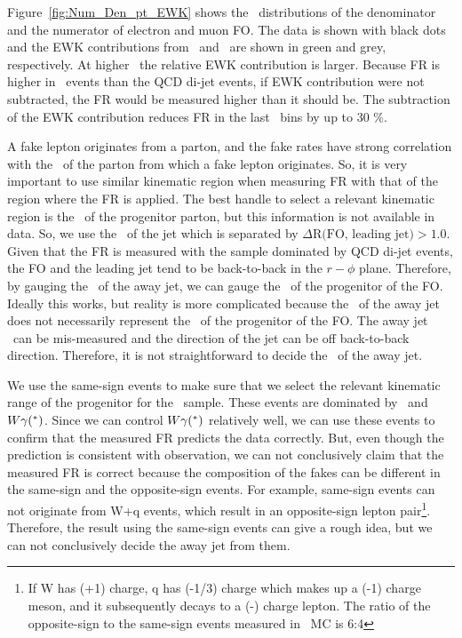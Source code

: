 Figure~\ref{fig:Num_Den_pt_EWK} shows the \pt\ distributions of the denominator and the 
numerator of electron and muon FO. The data is shown with black dots and 
the EWK contributions from \dyll\ and \Wjets\ are shown in green 
and grey, respectively. At higher \pt\ the relative EWK contribution 
is larger. Because FR is higher in \Wjets\ events than the QCD di-jet 
events, if EWK contribution were not subtracted, the FR would be 
measured higher than it should be. The subtraction of the EWK contribution 
reduces FR in the last \pt\ bins by up to 30 \%.

A fake lepton originates from a parton, and the fake rates have strong 
correlation with the \pt\ of the parton from which a fake lepton originates.
So, it is very important to use similar kinematic region when measuring FR 
with that of the region where the FR is applied. The best handle to select 
a relevant kinematic region is the 
\pt\ of the progenitor parton, but this information is not available in data.   
So, we use the \pt\ of the jet which is separated by $\Delta \textrm{R(FO, leading jet)} > 1.0$.  
Given that the FR is measured with the sample dominated by QCD di-jet events, 
the FO and the leading jet tend to be back-to-back in the $r-\phi$ plane.
Therefore, by gauging the \pt\ of the away jet, we can gauge the \pt\ 
of the progenitor of the FO. Ideally this works, but reality is more 
complicated because the \pt\ of the away jet does not necessarily represent 
the \pt\ of the progenitor of the FO. The away jet \pt\ can be mis-measured 
and the direction of the jet can be off back-to-back direction.  
Therefore, it is not straightforward to decide the \pt\ of the away jet. 

We use the same-sign events to make sure that we select the 
relevant kinematic range of the progenitor for the \Wjets\ sample. 
These events are dominated by \Wjets\ and $W\gamma(^*)$. 
Since we can control $W\gamma(^*)$
relatively well, we can use these events to confirm that the measured 
FR predicts the data correctly. 
But, even though the prediction is consistent with observation, 
we can not conclusively claim that the measured FR is correct 
because the composition of the fakes can be different in the same-sign 
and the opposite-sign events. 
For example, same-sign events can not originate from W+q events, 
which result in an opposite-sign lepton pair\footnote{If W has (+1) charge, 
q has (-1/3) charge which makes up a (-1) charge meson, and it subsequently decays 
to a (-) charge lepton. The ratio of the opposite-sign to the same-sign events 
measured in \Wjets\ MC is 6:4}. Therefore, the result using the same-sign events can 
give a rough idea, but we can not conclusively decide the away jet \pt from them. 

